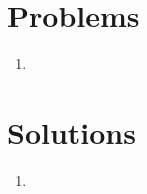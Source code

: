 \documentclass[12pt]{report}
\begin{document}
\section{Problems}
\begin{enumerate}
\setlength\itemsep{1em}
    \item{}
\end{enumerate}

\section{Solutions}
\begin{enumerate}
\setlength\itemsep{1em}
    \item{}
\end{enumerate}
\end{document}
